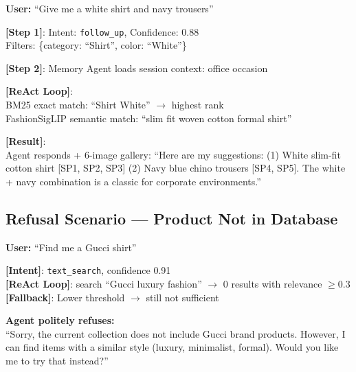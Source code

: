 \begin{tcolorbox}[title=Turn 2 Walkthrough]
\textbf{User:} ``Give me a white shirt and navy trousers''

\textbf{[Step 1]}: Intent: \texttt{follow\_up}, Confidence: 0.88\\
Filters: \{category: ``Shirt'', color: ``White''\}

\textbf{[Step 2]}: Memory Agent loads session context: office occasion

\textbf{[ReAct Loop]}:\\
BM25 exact match: ``Shirt White'' $\rightarrow$ highest rank\\
FashionSigLIP semantic match: ``slim fit woven cotton formal shirt''

\textbf{[Result]}:\\
Agent responds + 6-image gallery: ``Here are my suggestions: (1) White slim-fit cotton shirt [SP1, SP2, SP3] (2) Navy blue chino trousers [SP4, SP5]. The white + navy combination is a classic for corporate environments.''
\end{tcolorbox}

\subsection{Refusal Scenario --- Product Not in Database}

\begin{tcolorbox}[title=Handling No Results Found]
\textbf{User:} ``Find me a Gucci shirt''

\textbf{[Intent]}: \texttt{text\_search}, confidence 0.91\\
\textbf{[ReAct Loop]}: search ``Gucci luxury fashion'' $\rightarrow$ 0 results with relevance $\geq 0.3$\\
\textbf{[Fallback]}: Lower threshold $\rightarrow$ still not sufficient

\textbf{Agent politely refuses:}\\
``Sorry, the current collection does not include Gucci brand products. However, I can find items with a similar style (luxury, minimalist, formal). Would you like me to try that instead?''
\end{tcolorbox}

